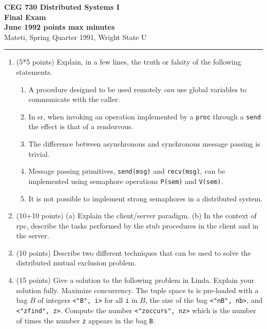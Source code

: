 \def\fat{\framebox[1mm]{\rule{0mm}{2mm}}}
\def\CSP{{\sc csp}}
\def\RPC{{\sc rpc}}
\def\SR{{\sc sr}}
\parindent=0pt



{\bf CEG 
\large \bf 730 Distributed Systems I\\[5pt]
\large Final Exam\\[10pt]
June 1992  points max  minutes\\
}
\bigskip
{Mateti,  Spring Quarter 1991, Wright State U}\\[-5pt]
\hrule

\begin{enumerate}

\item (5*5 points)
Explain, in a few lines, the truth or falsity of the following
statements.

\begin{enumerate}
\item
A procedure designed to be used remotely {\em can} use global
variables to communicate with the caller.

\item
In \SR, when invoking an operation implemented by a {\tt proc} through
a {\tt send} the effect is that of a rendezvous.

\item
The difference between asynchronous and synchronous message
passing is trivial.

\item
Message passing primitives, {\tt send(msg)} and {\tt recv(msg)}, can
be implemented using semaphore operations {\tt P(sem)}
and {\tt V(sem)}.

\item
It is not possible to implement strong semaphores in a distributed
system.

\end{enumerate}


\item (10+10 points)
(a) Explain the client/server paradigm.  (b) In the context of \RPC,
describe the tasks performed by the stub procedures in the client and
in the server.

\item (10 points)  
Describe two different techniques that can be used to solve the
distributed mutual exclusion problem.

\item (15 points) Give a solution to the following problem in Linda.
Explain your solution fully.  Maximize concurrency.  The tuple space
{\sc ts} is pre-loaded with a bag $B$ of integers {\tt <"B", i>} for
all {\tt i} in $B$, the size of the bag {\tt <"nB", nb>}, and {\tt
<"zfind", z>}.  Compute the number {\tt <"zoccurs", nz>} which is the
number of times the number {\tt z} appears in the bag {\tt B}.



\end{enumerate}
